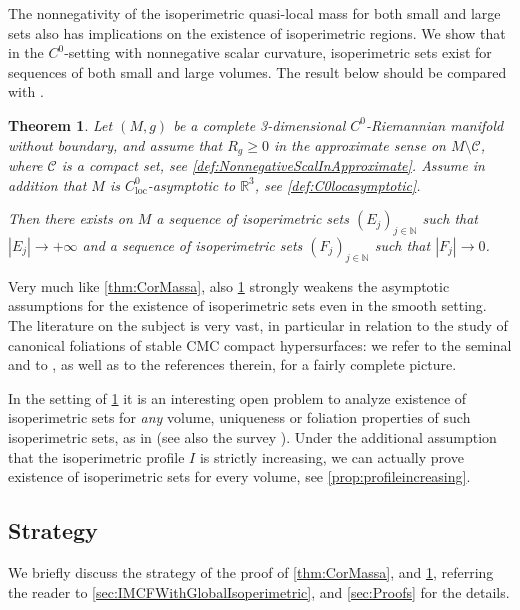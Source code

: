 \documentclass[a4paper,12pt,reqno]{amsart}
\numberwithin{equation}{section}
\theoremstyle{plain}
\newtheorem{theorem}{Theorem}[section]
\theoremstyle{definition}
\theoremstyle{remark}
\begin{document}
The nonnegativity of the isoperimetric quasi-local mass for both small and large sets also has implications on the existence of isoperimetric regions. We show that in the $C^0$-setting with nonnegative scalar curvature, isoperimetric sets exist for sequences of both small and large volumes. The result below should be compared with \cite[Proposition K.1]{CarlottoChodoshEichmair}.


\begin{theorem}\label{thm:CorIsop}
Let $(M,g)$ be a complete 3-dimensional $C^0$-Riemannian manifold without boundary, and assume that $R_{g}\geq 0$ in the approximate sense on $M\setminus \mathcal{C}$, where $\mathcal{C}$ is a compact set, see \cref{def:NonnegativeScalInApproximate}. Assume in addition that $M$ is $C^0_{\mathrm{loc}}$-asymptotic to $\mathbb R^3$, see \cref{def:C0locasymptotic}.

Then there exists on $M$ a sequence of isoperimetric sets $(E_j)_{j\in\mathbb N}$ such that $|E_j|\to +\infty$ and a sequence of isoperimetric sets $(F_j)_{j\in\mathbb N}$ such that $|F_j|\to 0$. 
\end{theorem}

Very much like \cref{thm:CorMassa}, also \cref{thm:CorIsop} strongly weakens the asymptotic assumptions for the  existence of isoperimetric sets even in the smooth setting.
The literature on the subject is very vast, in particular in relation to the study of canonical foliations of stable CMC compact hypersurfaces:
we refer to the seminal \cite{HuiskenYauFoliations} and to \cite{CarlottoChodoshEichmair, eichmair-metzger_jdg, EichmairMetzger, nerz, ChodoshEichmairShiYu21, yu, eichmair-koerber, sinestrari-tenan}, as well as to the references therein, for a fairly complete picture.  

In the setting of \cref{thm:CorIsop} it is an interesting open problem to analyze existence of isoperimetric sets for \textit{any}  volume, uniqueness or foliation properties of such isoperimetric sets, as in \cite{nerz, ChodoshEichmairShiYu21, yu} (see also the survey \cite{BFSurvey}). Under the additional assumption that the isoperimetric profile $I$ is strictly increasing, we can actually prove existence of isoperimetric sets for every volume, see \cref{prop:profileincreasing}.

\bigskip

\subsection{Strategy}\label{sec:Strategy}
We briefly discuss the strategy of the proof of \cref{thm:CorMassa}, and \cref{thm:CorIsop}, referring the reader to \cref{sec:IMCFWithGlobalIsoperimetric}, and \cref{sec:Proofs} for the details. 
\end{document}
